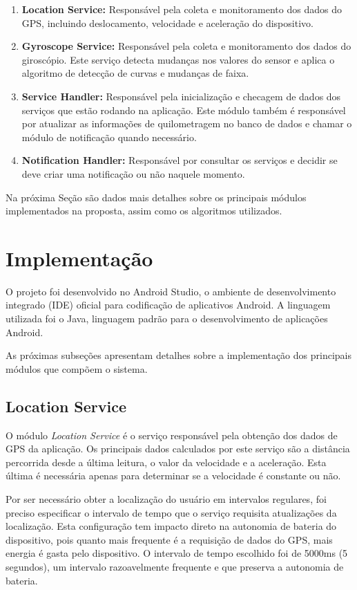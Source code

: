 \begin{enumerate}
  \item \textbf{Location Service:} Responsável pela coleta e monitoramento dos dados do GPS, incluindo deslocamento, velocidade e
  aceleração do dispositivo.
  \item \textbf{Gyroscope Service:} Responsável pela coleta e monitoramento dos dados do giroscópio. Este serviço detecta mudanças
  nos valores do sensor e aplica o algoritmo de detecção de curvas e mudanças de faixa.
  \item \textbf{Service Handler:} Responsável pela inicialização e checagem de dados dos serviços que estão rodando na aplicação.
  Este módulo também é responsável por atualizar as informações de quilometragem no banco de dados e chamar o módulo de notificação
  quando necessário.
  \item \textbf{Notification Handler:} Responsável por consultar os serviços e decidir se deve criar uma notificação ou não naquele
  momento.
\end{enumerate}

Na próxima Seção são dados mais detalhes sobre os principais módulos implementados na proposta, assim como os algoritmos utilizados.

\section{Implementação}
\label{sec-implementacao}

O projeto foi desenvolvido no Android Studio, o ambiente de desenvolvimento integrado (IDE) oficial para
codificação de aplicativos Android. A linguagem utilizada foi o Java, linguagem padrão para o desenvolvimento
de aplicações Android.

As próximas subseções apresentam detalhes sobre a implementação dos principais módulos que compõem o sistema.

\subsection{Location Service}
\label{location-service}

O módulo \textit{Location Service} é o serviço responsável pela obtenção dos dados de GPS da aplicação. Os principais dados calculados
por este serviço são a distância percorrida desde a última leitura, o valor da velocidade e a aceleração. Esta última é necessária
apenas para determinar se a velocidade é constante ou não.

Por ser necessário obter a localização do usuário em intervalos regulares, foi preciso especificar o intervalo de tempo que o
serviço requisita atualizações da localização. Esta configuração tem impacto direto na autonomia de bateria do dispositivo,
pois quanto mais frequente é a requisição de dados do GPS, mais energia é gasta pelo dispositivo. O intervalo de tempo escolhido
foi de 5000ms (5 segundos), um intervalo razoavelmente frequente e que preserva a autonomia de bateria.

